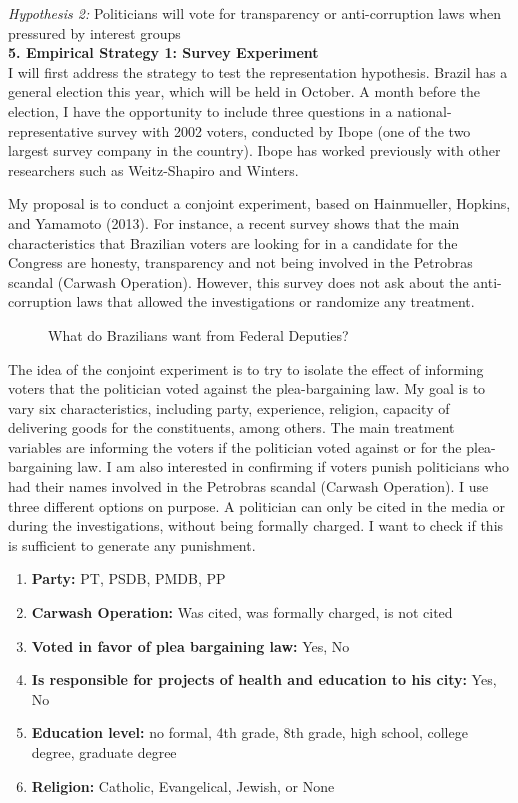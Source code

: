 \documentclass[12pt,a4paper]{article}
\begin{document}
\emph{Hypothesis 2:} Politicians will vote for transparency or anti-corruption laws when pressured by interest groups \\


\textbf{5. Empirical Strategy 1: Survey Experiment }\\
 
I will first address the strategy to test the representation hypothesis. Brazil has a general election this year, which will be held in October. A month before the election, I have the opportunity to include three questions in a national-representative survey with 2002 voters, conducted by Ibope (one of the two largest survey company in the country). Ibope has worked previously with other researchers such as Weitz-Shapiro and Winters. 

My proposal is to conduct a conjoint experiment, based on Hainmueller, Hopkins, and Yamamoto (2013). For instance, a recent survey shows that the main characteristics that Brazilian voters are looking for in a candidate for the Congress are honesty, transparency and not being involved in the Petrobras scandal (Carwash Operation). However, this survey does not ask about the anti-corruption laws that allowed the investigations or randomize any treatment. 


\begin{figure}[ht]
  \centering
  \scalebox{1}{}
  \caption{What do Brazilians want from Federal Deputies?} 
\end{figure}


The idea of the conjoint experiment is to try to isolate the effect of informing voters that the politician voted against the plea-bargaining law. My goal is to vary six characteristics, including party, experience, religion, capacity of delivering goods for the constituents, among others. The main treatment variables are informing the voters if the politician voted against or for the plea-bargaining law. I am also interested in confirming if voters punish politicians who had their names involved in the Petrobras scandal (Carwash Operation). I use three different options on purpose. A politician can only be cited in the media or during the investigations, without being formally charged. I want to check if this is sufficient to generate any punishment.

\begin{enumerate}
    	\item \textbf{Party:} PT, PSDB, PMDB, PP
        \item \textbf{Carwash Operation:} Was cited, was formally charged, is not cited 
        \item \textbf{Voted in favor of plea bargaining law:} Yes, No
        \item \textbf{Is responsible for projects of health and education to his city:} Yes, No
        \item \textbf{Education level:} no formal, 4th grade, 8th grade, high school, college degree, graduate degree
        \item \textbf{Religion:} Catholic, Evangelical, Jewish, or None  
    \end{enumerate}
    
\end{document}
